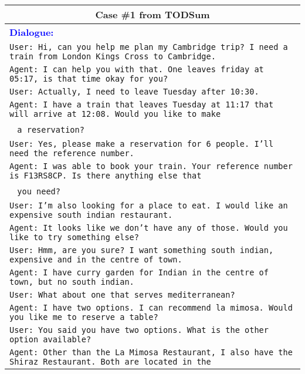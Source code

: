 \documentclass[11pt]{article}
\begin{document}
\begin{table*}[t]
        \centering
        \begin{adjustbox}{width=1.00\textwidth,center}
        \begin{tabular}{ | l | }
        \toprule
        \multicolumn{1}{|c|}{\textbf{Case \#1 from TODSum}} \\ \hline
        \textbf{\textcolor{blue}{Dialogue:}} \\ \hline

        \texttt{User: Hi, can you help me plan my Cambridge trip? I need a train from London Kings Cross to Cambridge.} \\
        \texttt{Agent: I can help you with that. One leaves friday at 05:17, is that time okay for you?} \\
        \texttt{User: Actually, I need to leave Tuesday after 10:30.} \\
        \texttt{Agent: I have a train that leaves Tuesday at 11:17 that will arrive at 12:08. Would you like to make} \\
        \quad\quad\quad~ \texttt{a reservation?} \\
        \texttt{User: Yes, please make a reservation for 6 people. I'll need the reference number. } \\
        \texttt{Agent: I was able to book your train. Your reference number is F13RS8CP. Is there anything else that} \\
        \quad\quad\quad~ \texttt{you need?} \\
        \texttt{User: I'm also looking for a place to eat. I would like an expensive south indian restaurant.} \\
        \texttt{Agent: It looks like we don't have any of those. Would you like to try something else?} \\
        \texttt{User: Hmm, are you sure? I want something south indian, expensive and in the centre of town.} \\
        \texttt{Agent: I have curry garden for Indian in the centre of town, but no south indian.} \\
        \texttt{User: What about one that serves mediterranean?} \\
        \texttt{Agent: I have two options. I can recommend la mimosa. Would you like me to reserve a table?} \\
        \texttt{User: You said you have two options. What is the other option available?} \\
        \texttt{Agent: Other than the La Mimosa Restaurant, I also have the Shiraz Restaurant. Both are located in the} \\

\end{tabular}
\end{adjustbox}
\end{table*}
\end{document}
